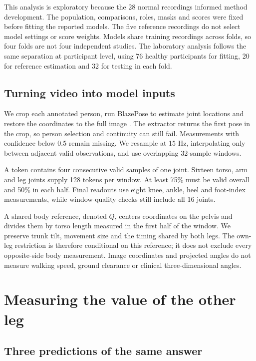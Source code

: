 \documentclass[letterpaper]{article}
\begin{document}
This analysis is exploratory because the 28 normal recordings informed method development. The population, comparisons, roles, masks and scores were fixed before fitting the reported models. The five reference recordings do not select model settings or score weights. Models share training recordings across folds, so four folds are not four independent studies. The laboratory analysis follows the same separation at participant level, using 76 healthy participants for fitting, 20 for reference estimation and 32 for testing in each fold.

\subsection{Turning video into model inputs}

We crop each annotated person, run BlazePose to estimate joint locations and restore the coordinates to the full image \citep{bazarevsky2020blazepose}. The extractor returns the first pose in the crop, so person selection and continuity can still fail. Measurements with confidence below 0.5 remain missing. We resample at 15 Hz, interpolating only between adjacent valid observations, and use overlapping 32-sample windows.

A token contains four consecutive valid samples of one joint. Sixteen torso, arm and leg joints supply 128 tokens per window. At least 75\% must be valid overall and 50\% in each half. Final readouts use eight knee, ankle, heel and foot-index measurements, while window-quality checks still include all 16 joints.

A shared body reference, denoted \(Q\), centers coordinates on the pelvis and divides them by torso length measured in the first half of the window. We preserve trunk tilt, movement size and the timing shared by both legs. The own-leg restriction is therefore conditional on this reference; it does not exclude every opposite-side body measurement. Image coordinates and projected angles do not measure walking speed, ground clearance or clinical three-dimensional angles.

\section{Measuring the value of the other leg}

\subsection{Three predictions of the same answer}
\end{document}
